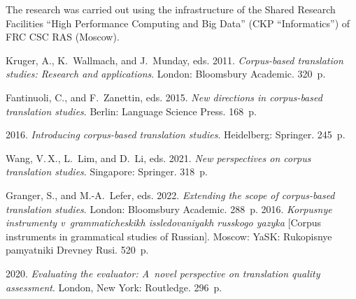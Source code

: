     
    
    


\Ack
    \noindent
    The research was carried out using the infrastructure of the Shared 
Research Facilities ``High Performance Computing and Big Data'' (CKP 
``Informatics'') of FRC CSC RAS (Moscow).




  \begin{multicols}{2}

\renewcommand{\bibname}{\protect\rmfamily References}

{\small\frenchspacing
 {%
 \begin{thebibliography}{99}
 
Kruger, A., K.~Wallmach, and J.~Munday, eds. 2011. \textit{Corpus-based translation studies: Research and applications}. London: 
Bloomsbury Academic. 320~p.

    Fantinuoli, C., and F.~Zanettin, eds. 2015. \textit{New directions in 
corpus-based translation studies}. Berlin: Language Science Press. 
168~p.
   
 2016. \textit{Introducing corpus-based translation 
studies}. Heidelberg: Springer. 245~p.

    Wang, V.\,X., L.~Lim, and D.~Li, eds. 2021. \textit{New 
perspectives on corpus translation studies}. Singapore: Springer. 318~p.

    Granger, S., and M.-A.~Lefer, eds. 2022. \textit{Extending the 
scope of corpus-based translation studies}. London: Bloomsbury 
Academic. 288~p.
     2016. \textit{Korpusnye instrumenty 
v~grammaticheskikh issledovaniyakh russkogo yazyka} [Corpus 
instruments in grammatical studies of Russian]. Moscow: YaSK: 
Rukopisnye pamyatniki Drevney Rusi. 520~p.

     2020. \textit{Evaluating the evaluator: A~novel 
perspective on translation quality assessment}. London, New York: 
Routledge. 296~p.


\end{thebibliography}}}
\end{multicols}
